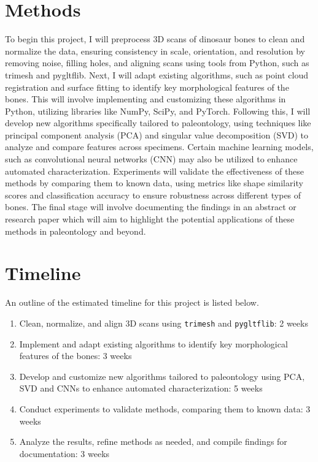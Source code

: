 \documentclass[12pt]{article}
\begin{document}
\section{Methods}
To begin this project, I will preprocess 3D scans of dinosaur bones to clean and
normalize the data, ensuring consistency in scale, orientation, and resolution
by removing noise, filling holes, and aligning scans using tools from Python,
such as trimesh and pygltflib. Next, I will adapt existing algorithms, such as
point cloud registration and surface fitting to identify key morphological
features of the bones. This will involve implementing and customizing these
algorithms in Python, utilizing libraries like NumPy, SciPy, and PyTorch.
Following this, I will develop new algorithms specifically tailored to
paleontology, using techniques like principal component analysis (PCA) and
singular value decomposition (SVD) to analyze and compare features across specimens.
Certain machine learning models, such as convolutional neural networks (CNN) may also
be utilized to enhance automated characterization. Experiments will validate the
effectiveness of these methods by comparing them to known data, using metrics
like shape similarity scores and classification accuracy to ensure robustness
across different types of bones. The final stage will involve documenting the
findings in an abstract or research paper which will aim to highlight the
potential applications of these methods in paleontology and beyond.

\section{Timeline}
An outline of the estimated timeline for this project is listed below.

\begin{enumerate}
	\item Clean, normalize, and align 3D scans using \texttt{trimesh} and
	\texttt{pygltflib}: 2 weeks
	\item Implement and adapt existing algorithms to identify key morphological
	features of the bones: 3 weeks
	\item Develop and customize new algorithms tailored to paleontology using
	PCA, SVD and CNNs to enhance automated characterization: 5 weeks
	\item Conduct experiments to validate methods, comparing them to known data:
	3 weeks
	\item Analyze the results, refine methods as needed, and compile findings
	for documentation: 3 weeks
\end{enumerate}
\end{document}
